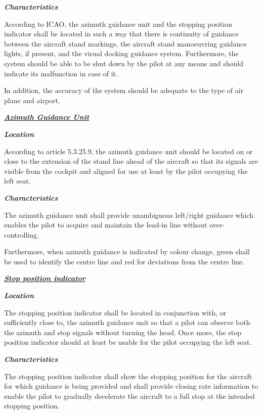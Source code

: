 		\textbf{\textit{Characteristics}}
		
		According to ICAO, the azimuth guidance unit and the stopping position indicator shall be located in such a way that there is continuity of guidance between the aircraft stand markings, the aircraft stand manoeuvring guidance lights, if present, and the visual docking guidance system. Furthermore, the system should be able to be shut down by the pilot at any means and should indicate its malfunction in case of it.
		
		In addition, the accuracy of the system should be adequate to the type of air plane and airport.
		
		\underline{\textbf{\textit{Azimuth Guidance Unit}}}
		
		\textbf{\textit{Location}}
		
		According to article 5.3.25.9, the azimuth guidance unit should be located on or close to the extension of the stand line ahead of the aircraft so that its signals are visible from the cockpit and aligned for use at least by the pilot occupying the left seat. 
		
		\textbf{\textit{Characteristics}}
		
		The azimuth guidance unit shall provide unambiguous left/right guidance which enables the pilot to acquire and maintain the lead-in line without over-controlling.
		
		Furthermore, when azimuth guidance is indicated by colour change, green shall be used to identify the centre line and red for deviations from the centre line.
		
		\underline{\textbf{\textit{Stop position indicator}}}
		
		\textbf{\textit{Location}}
		
		The stopping position indicator shall be located in conjunction with, or sufficiently close to, the azimuth guidance unit so that a pilot can observe both the azimuth and stop signals without turning the head. Once more, the stop position indicator should at least be usable for the pilot occupying the left seat.
		
		\textbf{\textit{Characteristics}}
		
		The stopping position indicator shall show the stopping position for the aircraft for which guidance is being provided and shall provide closing rate information to enable the pilot to gradually decelerate the aircraft to a full stop at the intended stopping position.
	